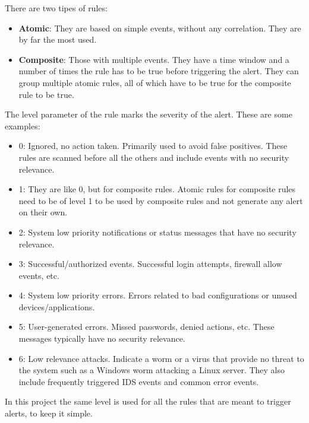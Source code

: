 \linej
\linej
There are two tipes of rules\cite{libro_ossec}:
\begin{itemize}
	\item \textbf{Atomic}: They are based on simple events, without any correlation. They are by far the most used.
	\item \textbf{Composite}: Those with multiple events. They have a time window and a number of times the rule has to be true before triggering the alert. They can group multiple atomic rules, all of which have to be true for the composite rule to be true.
\end{itemize}
\linej
The level parameter of the rule marks the severity of the alert. These are some examples\cite{libro_ossec}:
\begin{itemize}
	\item 0: Ignored, no action taken. Primarily used to avoid false positives. These rules are scanned before all the others and include events with no security relevance.
	\item 1: They are like 0, but for composite rules. Atomic rules for composite rules need to be of level 1 to be used by composite rules and not generate any alert on their own.
	\item 2: System low priority notifications or status messages that have no security relevance.
	\item 3: Successful/authorized events. Successful login attempts, firewall allow events, etc.
	\item 4: System low priority errors. Errors related to bad configurations or unused devices/applications.
	\item 5: User-generated errors. Missed passwords, denied actions, etc. These messages typically have no security relevance.
	\item 6: Low relevance attacks. Indicate a worm or a virus that provide no threat to the system such as a Windows worm attacking a Linux server. They also include frequently triggered IDS events and common error events.
\end{itemize}
In this project the same level is used for all the rules that are meant to trigger alerts, to keep it simple.

